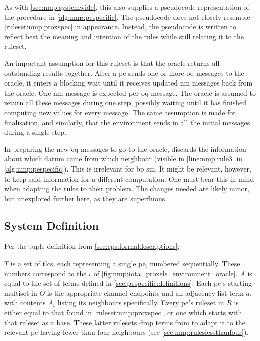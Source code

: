 As with \cref{sec:nmp:systemwide}, this  also supplies a pseudocode representation of the procedure in \cref{alg:nmp:pespecific}.  The pseudocode does not closely resemble \cref{ruleset:nmp:proxspec} in appearance.  Instead, the pseudocode is written to reflect best the meaning and intention of the rules while still relating it to the \gls{ruleset}.

An important assumption for this \gls{ruleset} is that the oracle returns all outstanding results together.  After a \gls{pe} sends one or more \gls{oq} messages to the oracle, it enters a blocking wait until it receives updated \gls{nm} messages back from the oracle.  One \gls{nm} message is expected per \gls{oq} message.  The oracle is assumed to return all these messages during one step, possibly waiting until it has finished computing new values for every message.  The same assumption is made for finalisation, and similarly, that the environment sends in all the initial messages during a single step.

In preparing the new \gls{oq} messages to go to the oracle,  discards the information about which datum came from which neighbour (visible in \cref{line:nmp:rule3} in \cref{alg:nmp:pespecific}).  This is irrelevant for \gls{bp} \gls{sm}.  It might be relevant, however, to keep said information for a different computation.  One must bear this in mind when adapting the rules to their problem.  The changes needed are likely minor, but unexplored further here, as they are superfluous.

\subsection{System Definition}
Per the tuple definition from \cref{sec:cps:formaldescriptions}:


\(T\) is a set of \glspl{tlc}, each representing a single \gls{pe}, numbered sequentially.  These numbers correspond to the \(\iota\) of \cref{fig:nmp:iota_proxels_environment_oracle}.  \(A\) is equal to the set of terms defined in \cref{sec:pespecific:definitions}.  Each \gls{pe}'s starting multiset in \(O\) is the appropriate channel endpoints and an adjacency list term \(a\), with contents \(A_t\) listing its neighbours specifically.  Every \gls{pe}'s \gls{ruleset} in \(R\) is either equal to that found in \cref{ruleset:nmp:proxspec}, or one which starts with that \gls{ruleset} as a base.  These latter \glspl{ruleset} drop terms from  to adapt it to the relevant \gls{pe} having fewer than four neighbours (see \cref{sec:nmp:ruleslessthanfour}).

